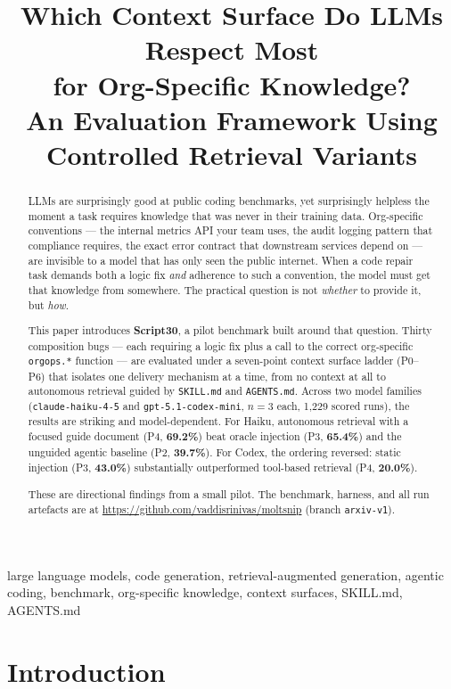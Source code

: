 \documentclass[10pt,conference]{IEEEtran}
\title{Which Context Surface Do LLMs Respect Most\\for Org-Specific Knowledge?\\
{\large An Evaluation Framework Using Controlled Retrieval Variants}}
\author{
  \IEEEauthorblockN{Srinivas Vaddi}
  \IEEEauthorblockA{Independent Researcher\\
  \href{https://github.com/vaddisrinivas/moltsnip}{github.com/vaddisrinivas/moltsnip}}
}
\begin{document}
\maketitle

\begin{abstract}
LLMs are surprisingly good at public coding benchmarks, yet surprisingly helpless the moment a task requires knowledge that was never in their training data.
Org-specific conventions --- the internal metrics API your team uses, the audit logging pattern that compliance requires, the exact error contract that downstream services depend on --- are invisible to a model that has only seen the public internet.
When a code repair task demands both a logic fix \emph{and} adherence to such a convention, the model must get that knowledge from somewhere.
The practical question is not \emph{whether} to provide it, but \emph{how}.

This paper introduces \textbf{Script30}, a pilot benchmark built around that question.
Thirty composition bugs --- each requiring a logic fix plus a call to the correct org-specific \texttt{orgops.*} function --- are evaluated under a seven-point context surface ladder (P0--P6) that isolates one delivery mechanism at a time, from no context at all to autonomous retrieval guided by \texttt{SKILL.md} and \texttt{AGENTS.md}.
Across two model families (\texttt{claude-haiku-4-5} and \texttt{gpt-5.1-codex-mini}, $n{=}3$ each, 1,229 scored runs), the results are striking and model-dependent.
For Haiku, autonomous retrieval with a focused guide document (P4, \textbf{69.2\%}) beat oracle injection (P3, \textbf{65.4\%}) and the unguided agentic baseline (P2, \textbf{39.7\%}).
For Codex, the ordering reversed: static injection (P3, \textbf{43.0\%}) substantially outperformed tool-based retrieval (P4, \textbf{20.0\%}).

These are directional findings from a small pilot.
The benchmark, harness, and all run artefacts are at \url{https://github.com/vaddisrinivas/moltsnip} (branch \texttt{arxiv-v1}).
\end{abstract}

\begin{IEEEkeywords}
large language models, code generation, retrieval-augmented generation, agentic coding, benchmark, org-specific knowledge, context surfaces, SKILL.md, AGENTS.md
\end{IEEEkeywords}

\section{Introduction}
\label{sec:introduction}
\end{document}
